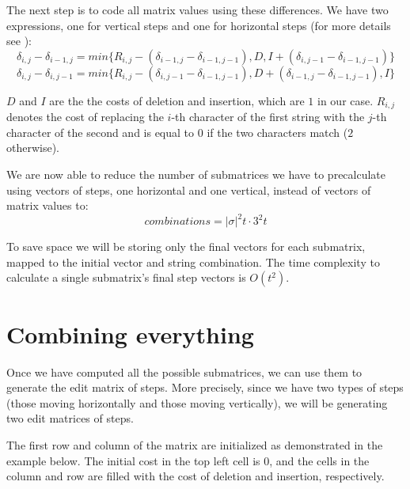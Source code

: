 \documentclass[times, utf8, seminar, numeric]{fer}
\begin{document}
The next step is to code all matrix values using these differences. We have two expressions, one for vertical steps and one for horizontal steps (for more details see \citep{masek1980faster}):
\begin{equation}
\delta_{i,j} - \delta_{i-1,j} = min\{R_{i,j} - (\delta_{i-1,j}-\delta_{i-1,j-1}), D, I + (\delta_{i,j-1} - \delta_{i-1, j-1})\}
\end{equation}
\begin{equation}
\delta_{i,j} - \delta_{i,j-1} = min\{R_{i,j} - (\delta_{i,j-1}-\delta_{i-1,j-1}), D + (\delta_{i-1,j} - \delta_{i-1, j-1}), I\}
\end{equation}

$D$ and $I$ are the the costs of deletion and insertion, which are $1$ in our case. $R_{i,j}$ denotes the cost of replacing the $i$-th character of the first string with the $j$-th character of the second and is equal to $0$ if the two characters match ($2$ otherwise).

We are now able to reduce the number of submatrices we have to precalculate using vectors of steps, one horizontal and one vertical, instead of vectors of matrix values to:
\begin{equation}
combinations = |\sigma|^2t \cdot 3^2t
\end{equation}

To save space we will be storing only the final vectors for each submatrix, mapped to the initial vector and string combination. The time complexity to calculate a single submatrix's final step vectors is $O(t^2)$.

\section{Combining everything}
Once we have computed all the possible submatrices, we can use them to generate the edit matrix of steps. More precisely, since we have two types of steps (those moving horizontally and those moving vertically), we will be generating two edit matrices of steps.

The first row and column of the matrix are initialized as demonstrated in the example below. The initial cost in the top left cell is 0, and the cells in the column and row are filled with the cost of deletion and insertion, respectively.
\end{document}
